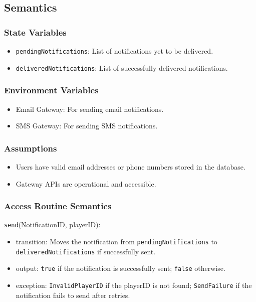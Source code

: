 \documentclass[12pt, titlepage]{article}
\begin{document}
\subsection{Semantics}

\subsubsection{State Variables}

\begin{itemize}
    \item \texttt{pendingNotifications}: List of notifications yet to be delivered.
    \item \texttt{deliveredNotifications}: List of successfully delivered notifications.
\end{itemize}

\subsubsection{Environment Variables}

\begin{itemize}
    \item Email Gateway: For sending email notifications.
    \item SMS Gateway: For sending SMS notifications.
\end{itemize}

\subsubsection{Assumptions}

\begin{itemize}
    \item Users have valid email addresses or phone numbers stored in the database.
    \item Gateway APIs are operational and accessible.
\end{itemize}

\subsubsection{Access Routine Semantics}

\noindent \texttt{send}(NotificationID, playerID):
\begin{itemize}
    \item transition: Moves the notification from \texttt{pendingNotifications} to \texttt{deliveredNotifications} if successfully sent.
    \item output: \texttt{true} if the notification is successfully sent; \texttt{false} otherwise.
    \item exception: \texttt{InvalidPlayerID} if the playerID is not found; \texttt{SendFailure} if the notification fails to send after retries.
\end{itemize}
\end{document}
